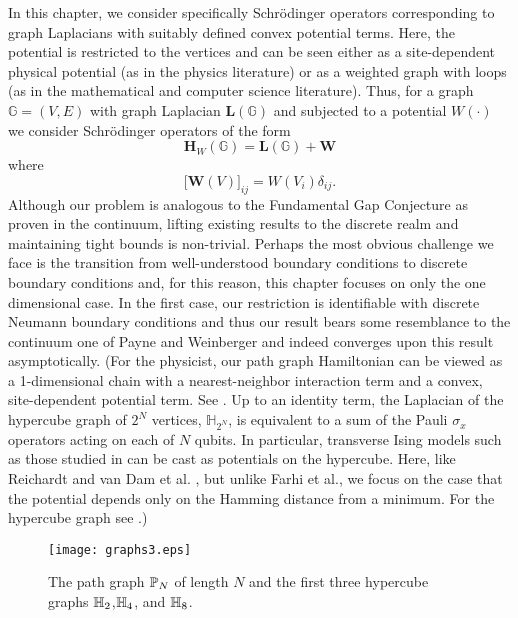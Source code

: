   In this chapter, we consider specifically Schr\"{o}dinger operators corresponding to graph Laplacians with suitably defined convex potential terms. Here, the potential is restricted to the vertices and can be seen either as a site-dependent physical potential (as in the physics literature) or as a weighted graph with loops (as in the mathematical and computer science literature). Thus, for a graph $\mathbb{G}=(V,E)$ with graph Laplacian $\mathbf{L(\mathbb{G})}$ and subjected to a potential $W(\cdot)$ we consider Schr\"{o}dinger operators of the form
  \begin{equation}
    \mathbf{H}_{W}(\mathbb{G}) = \mathbf{L(\mathbb{G})} + \mathbf{W}
  \end{equation}
  where
  \begin{equation}
    \big[\mathbf{W}(V)\big]_{ij} = W(V_i) \delta_{ij}.
  \end{equation}
  Although our problem is analogous to the Fundamental Gap Conjecture as proven in the continuum, lifting existing results to the discrete realm and maintaining tight bounds is non-trivial. Perhaps the most obvious challenge we face is the transition from well-understood boundary conditions to discrete boundary conditions and, for this reason, this chapter focuses on only the one dimensional case. In the first case, our restriction is identifiable with discrete Neumann boundary conditions and thus our result bears some resemblance to the continuum one of Payne and Weinberger \cite{Payne1960} and indeed converges upon this result asymptotically. (For the physicist, our path graph Hamiltonian can be viewed as a 1-dimensional chain with a nearest-neighbor interaction term and a convex, site-dependent potential term. See . Up to an identity term, the Laplacian of the hypercube graph of $2^N$ vertices,  $\mathbb{H}_{2^N}$, is equivalent to a sum of the Pauli $\sigma_x$ operators acting on each of $N$ qubits. In particular, transverse Ising models such as those studied in \cite{Farhi_science} can be cast as potentials on the hypercube. Here, like Reichardt\cite{R04} and van Dam et al. \cite{DMV01}, but unlike Farhi et al.\cite{Farhi_science}, we focus on the case that the potential depends only on the Hamming distance from a minimum. For the hypercube graph see .)
  
  \begin{figure}[htp]
    \texttt{[image: graphs3.eps]}
    \caption{\label{fig:path} The path graph $\mathbb{P}_{N}$ of length $N$ and the first three hypercube graphs $\mathbb{H}_{2}$,$\mathbb{H}_{4}$, and $\mathbb{H}_{8}$.}
  \end{figure}

